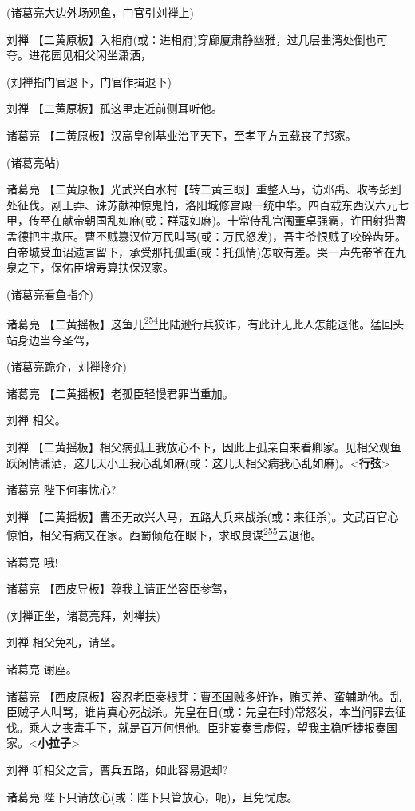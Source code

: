 (诸葛亮大边外场观鱼，门官引刘禅上)

刘禅
【二黄原板】入相府(或：进相府)穿廊厦肃静幽雅，过几层曲湾处倒也可夸。进花园见相父闲坐潇洒，

(刘禅指门官退下，门官作揖退下)

刘禅 【二黄原板】孤这里走近前侧耳听他。

诸葛亮 【二黄原板】汉高皇创基业治平天下，至孝平方五载丧了邦家。

(诸葛亮站)

诸葛亮
【二黄原板】光武兴白水村【转二黄三眼】重整人马，访邓禹、收岑彭到处征伐。剐王莽、诛苏献神惊鬼怕，洛阳城修宫殿一统中华。四百载东西汉六元七甲，传至在献帝朝国乱如麻(或：群寇如麻)。十常侍乱宫闱董卓强霸，许田射猎曹孟德把主欺压。曹丕贼篡汉位万民叫骂(或：万民怒发)，吾主爷恨贼子咬碎齿牙。白帝城受血诏遗言留下，承受那托孤重(或：托孤情)怎敢有差。哭一声先帝爷在九泉之下，保佑臣增寿算扶保汉家。

(诸葛亮看鱼指介)

诸葛亮
【二黄摇板】这鱼儿\protect\hyperlink{fn254}{\textsuperscript{254}}比陆逊行兵狡诈，有此计无此人怎能退他。猛回头站身边当今圣驾，

(诸葛亮跪介，刘禅搀介)

诸葛亮 【二黄摇板】老孤臣轻慢君罪当重加。

刘禅 相父。

刘禅
【二黄摇板】相父病孤王我放心不下，因此上孤亲自来看卿家。见相父观鱼跃闲情潇洒，这几天小王我心乱如麻(或：这几天相父病我心乱如麻)。\textless{}\textbf{行弦}\textgreater{}

诸葛亮 陛下何事忧心?

刘禅
【二黄摇板】曹丕无故兴人马，五路大兵来战杀(或：来征杀)。文武百官心惊怕，相父有病又在家。西蜀倾危在眼下，求取良谋\protect\hyperlink{fn255}{\textsuperscript{255}}去退他。

诸葛亮 哦!

诸葛亮 【西皮导板】尊我主请正坐容臣参驾，

(刘禅正坐，诸葛亮拜，刘禅扶)

刘禅 相父免礼，请坐。

诸葛亮 谢座。

诸葛亮
【西皮原板】容忍老臣奏根芽：曹丕国贼多奸诈，贿买羌、蛮辅助他。乱臣贼子人叫骂，谁肯真心死战杀。先皇在日(或：先皇在时)常怒发，本当问罪去征伐。乘人之丧毒手下，就是百万何惧他。臣非妄奏言虚假，望我主稳听捷报奏国家。\textless{}\textbf{小拉子}\textgreater{}

刘禅 听相父之言，曹兵五路，如此容易退却?

诸葛亮 陛下只请放心(或：陛下只管放心，呃)，且免忧虑。

